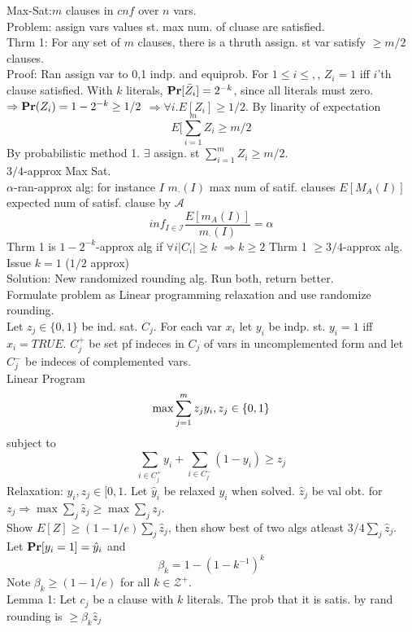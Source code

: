 \documentclass[a4paper]{article}
\def\Pr{\mbox{\textbf{Pr}}}
\begin{document}
Max-Sat:\(m\) clauses in \(cnf\) over \(n\) vars.\\
Problem: assign vars values st. max num. of cluase are satisfied.\\
Thrm 1: For any set of \(m\) clauses, there is a thruth assign. st var satisfy \(\geq m/2\) clauses.\\
Proof: Ran assign var to 0,1 indp. and equiprob. For \(1\leq i \leq ,\), \(Z_i=1\) iff \(i\)'th clause satisfied. With \(k\) literals, \(\Pr[\bar{Z}_i]=2^{-k}\), since all literals must zero. \(\Rightarrow \Pr(Z_i) = 1 - 2^{-k} \geq 1/2\) \(\Rightarrow \forall i.E[Z_i] \geq 1/2\). By linarity of expectation 
\[E[\sum_{i=1}^m Z_i \geq m/2\]
By probabilistic method 1. \(\exists\) assign. st \(\sum_{i=1}^m Z_i \geq m/2\).\\
\(3/4\)-approx Max Sat.\\
\(\alpha\)-ran-approx alg: for instance \(I\) \(m_{\cdot}(I)\) max num of satif. clauses \(E[M_A(I)]\) expected num of satisf. clause by \(\mathcal{A}\)
\[ inf_{I\in \mathcal{I}} \frac{E[m_A(I)]}{m_{\cdot}(I)}=\alpha\]
Thrm 1 is \(1-2^{-k}\)-approx alg if \(\forall i |C_i| \geq k\) \(\Rightarrow k\geq 2\) Thrm 1 \(\geq 3/4\)-approx alg.\\
Issue \(k=1\) (\(1/2\) approx)\\
Solution: New randomized rounding alg. Run both, return better.\\
Formulate problem as Linear programming relaxation and use randomize rounding.\\
Let \(z_j\in \{0,1\}\) be ind. sat. \(C_j\). For each var \(x_i\) let \(y_i\) be indp. st. \(y_i=1\) iff \(x_i=TRUE\). \(C_j^+\) be set pf indeces in \(C_j\) of vars in uncomplemented form and let \(C_j^-\) be indeces of complemented vars.\\
Linear Program
\[\max \sum_{j=1}^m z_j\\y_i,z_j \in \{0,1\}\]
subject to
\[\sum_{i\in C^+_j}y_i + \sum_{i \in C^-_j}(1-y_i) \geq z_j\]
Relaxation: \(y_i, z_j \in [0,1\). Let \(\hat{y}_i\) be relaxed \(y_i\) when solved. \(\hat{z}_j\) be val obt. for \(z_j \Rightarrow \max \sum_j \hat{z}_j \geq \max \sum_j z_j\).\\
Show \(E[Z] \geq (1-1/e)\sum_j \hat{z}_j\), then show best of two algs atleast \(3/4 \sum_j \hat{z}_j\).\\
Let \(\Pr[y_i=1] = \hat{y}_i\) and 
\[\beta_k = 1-(1-k^{-1})^k\]
Note \(\beta_k \geq (1-1/e)\) for all \(k \in \mathcal{Z}^+\).\\
Lemma 1: Let \(c_j\) be a clause with \(k\) literals. The prob that it is satis. by rand rounding is \(\geq \beta_k\hat{z}_j\)\\
\end{document}
